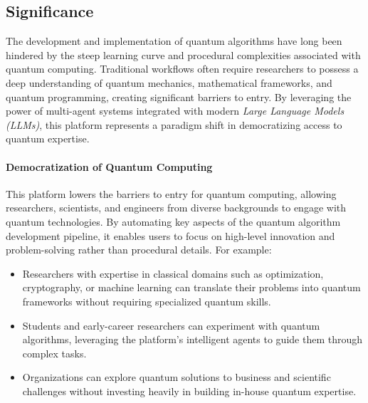 \documentclass[12pt]{article}
\begin{document}
\subsection{Significance}
The development and implementation of quantum algorithms have long been hindered by the steep learning curve and procedural complexities associated with quantum computing. Traditional workflows often require researchers to possess a deep understanding of quantum mechanics, mathematical frameworks, and quantum programming, creating significant barriers to entry. By leveraging the power of multi-agent systems integrated with modern \textit{Large Language Models (LLMs)}, this platform represents a paradigm shift in democratizing access to quantum expertise.

\paragraph{Democratization of Quantum Computing}
This platform lowers the barriers to entry for quantum computing, allowing researchers, scientists, and engineers from diverse backgrounds to engage with quantum technologies. By automating key aspects of the quantum algorithm development pipeline, it enables users to focus on high-level innovation and problem-solving rather than procedural details. For example:
\begin{itemize}
    \item Researchers with expertise in classical domains such as optimization, cryptography, or machine learning can translate their problems into quantum frameworks without requiring specialized quantum skills.
    \item Students and early-career researchers can experiment with quantum algorithms, leveraging the platform's intelligent agents to guide them through complex tasks.
    \item Organizations can explore quantum solutions to business and scientific challenges without investing heavily in building in-house quantum expertise.
\end{itemize}
\end{document}
